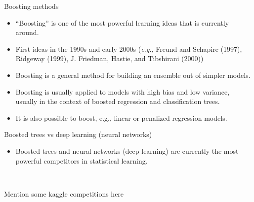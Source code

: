 \documentclass[
  10pt,
  ignorenonframetext,
]{beamer}
\providecommand{\tightlist}{%
  \setlength{\itemsep}{0pt}\setlength{\parskip}{0pt}}
\begin{document}
\begin{frame}
\begin{block}{Boosting methods}
\protect\hypertarget{boosting-methods}{}
\(~\)

\begin{itemize}
\tightlist
\item
  ``Boosting'' is one of the most powerful learning ideas that is
  currently around.
\end{itemize}

\vspace{2mm}

\begin{itemize}
\tightlist
\item
  First ideas in the 1990s and early 2000s (\emph{e.g.}, Freund and
  Schapire (1997), Ridgeway (1999), J. Friedman, Hastie, and Tibshirani
  (2000))
\end{itemize}

\vspace{2mm}

\begin{itemize}
\tightlist
\item
  Boosting is a general method for building an ensemble out of simpler
  models.
\end{itemize}

\vspace{2mm}

\begin{itemize}
\tightlist
\item
  Boosting is usually applied to models with high bias and low variance,
  usually in the context of boosted regression and classification trees.
\end{itemize}

\vspace{2mm}

\begin{itemize}
\tightlist
\item
  It is also possible to boost, e.g., linear or penalized regression
  models.
\end{itemize}
\end{block}
\end{frame}

\begin{frame}
\begin{block}{Boosted trees vs deep learning (neural networks)}
\protect\hypertarget{boosted-trees-vs-deep-learning-neural-networks}{}
\(~\)

\begin{itemize}
\tightlist
\item
  Boosted trees and neural networks (deep learning) are currently the
  most powerful competitors in statistical learning.
\end{itemize}

\(~\)

Mention some kaggle competitions here
\end{block}
\end{frame}
\end{document}

